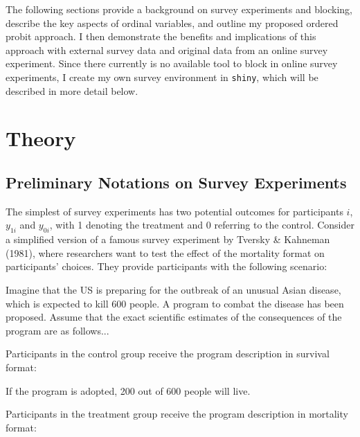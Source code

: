 \documentclass[12pt,econ]{sources/authesis}
\begin{document}
The following sections provide a background on survey experiments and blocking, describe the key aspects of ordinal variables, and outline my proposed ordered probit approach. I then demonstrate the benefits and implications of this approach with external survey data and original data from an online survey experiment. Since there currently is no available tool to block in online survey experiments, I create my own survey environment in \texttt{shiny}, which will be described in more detail below.

\hypertarget{ordblock-theory}{%
\section{Theory}\label{ordblock-theory}}

\hypertarget{ordblock-theory-experiments}{%
\subsection{Preliminary Notations on Survey Experiments}\label{ordblock-theory-experiments}}

The simplest of survey experiments has two potential outcomes for participants \(i\), \(y_{1i}\) and \(y_{0i}\), with 1 denoting the treatment and 0 referring to the control. Consider a simplified version of a famous survey experiment by Tversky \& Kahneman (1981), where researchers want to test the effect of the mortality format on participants' choices. They provide participants with the following scenario:

\vspace{0.3cm}
\begin{adjustwidth}{50pt}{50pt}
\ssp
\noindent Imagine that the US is preparing for the outbreak of an unusual Asian disease, which is expected to kill 600 people. A program to combat the disease has been proposed. Assume that the exact scientific estimates of the consequences of the program are as follows...
\end{adjustwidth}
Participants in the control group receive the program description in survival format:

\vspace{0.3cm}
\begin{adjustwidth}{50pt}{50pt}
\ssp
\noindent If the program is adopted, 200 out of 600 people will live.
\end{adjustwidth}
Participants in the treatment group receive the program description in mortality format:
\end{document}

